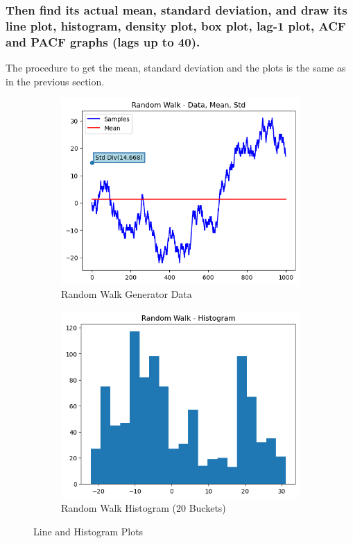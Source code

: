 \documentclass{article}
\begin{document}
\subsubsection{Then find its actual mean, standard deviation, and draw its line plot, histogram,
 density plot, box plot, lag-1 plot, ACF and PACF graphs (lags up to 40).}

The procedure to get the mean, standard deviation and the plots is the same as in the previous section.
 \begin{figure}[htbp]
  \centering
  \begin{subfigure}[b]{0.45\textwidth}
    \includegraphics[width=\textwidth]{img/random_walk/data.png}
    \caption{Random Walk Generator Data}
    \label{fig:rndmwalklines}
  \end{subfigure}
  \hfill
  \begin{subfigure}[b]{0.45\textwidth}
    \includegraphics[width=\textwidth]{img/random_walk/histogram.png}
    \caption{Random Walk Histogram (20 Buckets)}
    \label{fig:Rndmwalkhist}
  \end{subfigure}
  \caption{Line and Histogram Plots}
  \label{fig:randomwalk1}
\end{figure}
\end{document}
